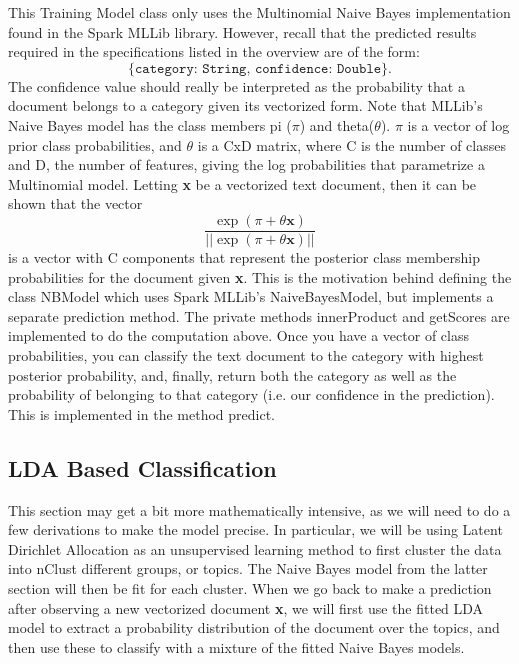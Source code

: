 \documentclass[a4paper,12pt]{article}
\renewcommand{\bf}[1]{\textbf{#1}}
\renewcommand{\tt}[1]{\texttt{#1}}
\newcommand{\3}{\left}
\newcommand{\4}{\right}
\renewcommand{\-}[1]{{}^{-#1}}
\begin{document}
This Training Model class only uses the Multinomial Naive Bayes implementation
found in the Spark MLLib library. However, recall that the predicted results required in the specifications listed in the overview are of the form:
$$
\tt{\{category: String, confidence: Double\}}.
$$
The confidence value should really be interpreted as the probability that a document belongs to a category given its vectorized form. Note that MLLib's Naive Bayes model has the class members pi ($\pi$) and theta($\theta$). $\pi$ is a vector of log prior class probabilities, and $\theta$ is a CxD matrix, where C is the number of classes and D, the number of features, giving the log probabilities that parametrize a Multinomial model. Letting \bf{x} be a vectorized text document, then it can be shown that the vector 
$$
\frac{\exp\3(\pi + \theta\bf{x}\4)}{||\exp\3(\pi + \theta\bf{x}\4)||}
$$
is a vector with C components that represent the posterior class membership probabilities for the document given \bf{x}. This is the motivation behind defining the class NBModel which uses Spark MLLib's NaiveBayesModel, but implements a separate prediction method. The private methods innerProduct and getScores are implemented to do the computation above. Once you have a vector of class probabilities, you can classify the text document to the category with highest posterior probability, and, finally, return both the category as well as the probability of belonging to that category (i.e. our confidence in the prediction). This is implemented in the method predict.

\subsection*{LDA Based Classification}

This section may get a bit more mathematically intensive, as we will need to do a few derivations to make the model precise. In particular, we will be using Latent Dirichlet Allocation as an unsupervised learning method 
to first cluster the data into nClust different groups, or topics. The Naive Bayes model from the latter section will then be fit for each cluster. When we go back to make a prediction after observing a new vectorized document \bf{x}, we will first use the fitted LDA model to extract a probability distribution of the document over the topics, and then use these to classify with a mixture of the fitted Naive Bayes models.
\end{document}
